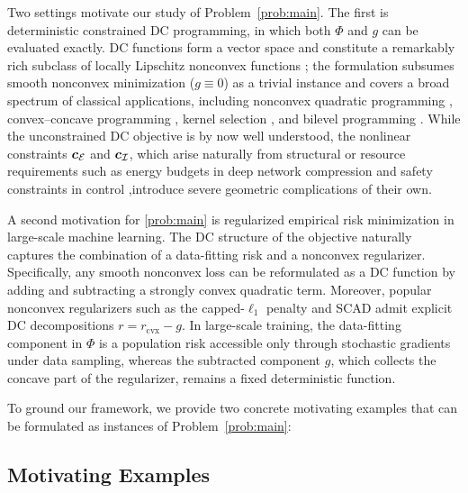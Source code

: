 \documentclass[english]{article}
\begin{document}
Two settings motivate our study of Problem~\eqref{prob:main}. The first is deterministic constrained DC programming, in which both
$\Phi$ and $g$ can be evaluated exactly. DC functions form a vector
space and constitute a remarkably rich subclass of locally Lipschitz
nonconvex functions \citep{Zhang-2020-Complexity,kong2024cost,davis2022gradient}; the formulation subsumes smooth nonconvex minimization ($g \equiv 0$) as a
trivial instance and covers a broad spectrum of classical
applications, including nonconvex quadratic programming
\citep{lethi1997solving,lethi1998branch}, convex--concave programming
\citep{yuille2003concave,shen2016disciplined}, kernel selection \citep{argyriou2006dc},
and bilevel programming \citep{lethi2009dc}. While the unconstrained DC
objective is by now well understood, the nonlinear constraints
$\bm{c}_{\mathcal{E}}$ and $\bm{c}_{\mathcal{I}}$, which arise naturally from
structural or resource requirements such as energy budgets in deep
network compression \citep{yang2019ecc,chen2018constraint} and safety
constraints in control \citep{paternain2019constrained},introduce
severe geometric complications of their own.

A second motivation for \eqref{prob:main} is regularized empirical risk minimization in large-scale machine learning. The DC structure of the objective naturally captures the combination of a data-fitting risk and a nonconvex regularizer. Specifically, any smooth nonconvex loss can be reformulated as a DC function by adding and subtracting a strongly convex quadratic term. Moreover, popular nonconvex regularizers such as the capped-$\ell_1$ penalty \citep{zhang2010analysis} and SCAD \citep{fan2001variable} admit explicit DC decompositions $r = r_{\mathrm{cvx}} - g$. In large-scale training, the data-fitting component in $\Phi$ is a
population risk accessible only through stochastic gradients under
data sampling, whereas the subtracted component $g$, which collects
the concave part of the regularizer, remains a fixed deterministic
function. 

To ground our framework, we provide two concrete motivating examples that can be formulated as instances of Problem~\eqref{prob:main}:

\subsection{Motivating Examples}
\end{document}
